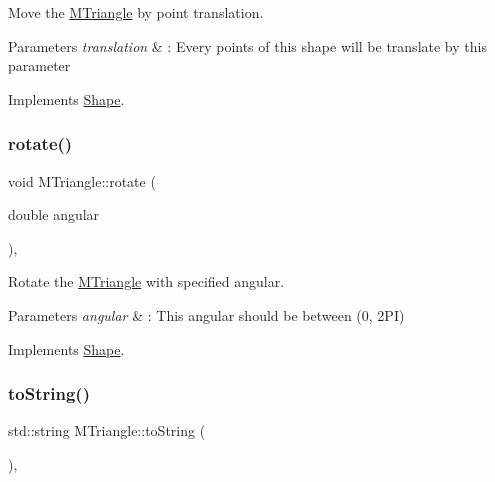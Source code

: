 Move the \hyperlink{classMTriangle}{M\+Triangle} by point translation. 


\begin{DoxyParams}{Parameters}
{\em translation} & \+: Every points of this shape will be translate by this parameter \\
\hline
\end{DoxyParams}


Implements \hyperlink{classShape_a52649731b2cb7b67315882d5e005f7e8}{Shape}.

\mbox{\label{classMTriangle_a4be29553eeddf99c367b1ec220bc102b}} 
\subsubsection{\texorpdfstring{rotate()}{rotate()}}
{\footnotesize\ttfamily void M\+Triangle\+::rotate (\begin{DoxyParamCaption}\item[{double}]{angular }\end{DoxyParamCaption})\hspace{0.3cm}{\ttfamily [override]}, {\ttfamily [virtual]}}



Rotate the \hyperlink{classMTriangle}{M\+Triangle} with specified angular. 


\begin{DoxyParams}{Parameters}
{\em angular} & \+: This angular should be between (0, 2\+PI) \\
\hline
\end{DoxyParams}


Implements \hyperlink{classShape_a2dea8616fd40f2d69fd208715921982a}{Shape}.

\mbox{\label{classMTriangle_a7d1fd825592dffa6ac05b3398a8c105a}} 
\subsubsection{\texorpdfstring{to\+String()}{toString()}}
{\footnotesize\ttfamily std\+::string M\+Triangle\+::to\+String (\begin{DoxyParamCaption}{ }\end{DoxyParamCaption})\hspace{0.3cm}{\ttfamily [override]}, {\ttfamily [virtual]}}



